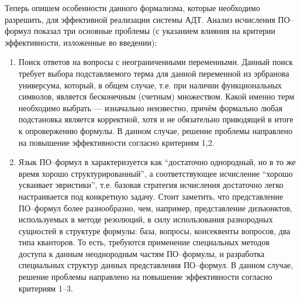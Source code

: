 Теперь опишем особенности данного формализма, которые необходимо разрешить, для эффективной реализации системы АДТ.
Анализ исчисления ПО--формул показал три основные проблемы (с указанием влияния на критерии эффективности, изложенные во введении):
\begin{enumerate}
\item {Поиск ответов на вопросы с неограниченными переменными.} Данный поиск требует выбора подставляемого терма для данной переменной из эрбранова универсума, который, в общем случае, т.е. при наличии функциональных символов, является бесконечным (счетным) множеством. Какой именно терм необходимо выбрать --- изначально неизвестно, причём формально любая подстановка является корректной, хотя и не обязательно приводящей в итоге к опровержению формулы. В данном случае, решение проблемы направлено на повышение эффективности согласно критериям 1,2.


\item Язык ПО--формул в \cite{ICDS2000} характеризуется как ``достаточно   однородный, но в то же время хорошо структурированный'', а соответствующее исчисление  ``хорошо усваивает эвристики'', т.е. базовая стратегия исчисления достаточно легко настраивается под конкретную задачу. Стоит заметить, что представление ПО--формул более разнообразно, чем, например, представление дизъюнктов, используемых в методе резолюций, в силу использования разнородных сущностей в структуре формулы: база, вопросы, консеквенты вопросов, два типа кванторов. То есть, требуются применение специальных методов доступа к данным неоднородным частям ПО--формулы, и разработка специальных структур данных представления ПО--формул. В данном случае, решение проблемы направлено на повышение эффективности согласно критериям 1--3.


\end{enumerate}

